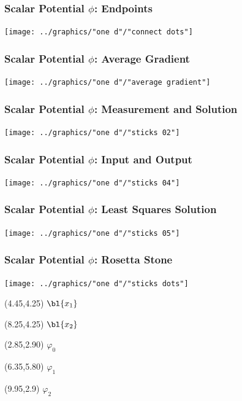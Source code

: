 \documentclass[handout]{beamer}
\begin{document}
\begin{frame}      %
\frametitle{Scalar Potential $\phi$: Endpoints}
  \begin{center}
    \texttt{[image: ../graphics/"one d"/"connect dots"]}
  \end{center}
\end{frame}

\begin{frame}      %
\frametitle{Scalar Potential $\phi$: Average Gradient}
  \begin{center}
    \texttt{[image: ../graphics/"one d"/"average gradient"]}
  \end{center}
\end{frame}

\begin{frame}      %
\frametitle{Scalar Potential $\phi$: Measurement and Solution}
  \begin{center}
    \texttt{[image: ../graphics/"one d"/"sticks 02"]}
  \end{center}
\end{frame}

\begin{frame}      %
\frametitle{Scalar Potential $\phi$: Input and Output}
  \begin{center}
    \texttt{[image: ../graphics/"one d"/"sticks 04"]}
  \end{center}
\end{frame}

\begin{frame}      %
\frametitle{Scalar Potential $\phi$: Least Squares Solution}
  \begin{center}
    \texttt{[image: ../graphics/"one d"/"sticks 05"]}
  \end{center}
\end{frame}

\begin{frame}      %
\frametitle{Scalar Potential $\phi$: Rosetta Stone}
  \begin{center}
    \texttt{[image: ../graphics/"one d"/"sticks dots"]}
  \end{center}
  \begin{textblock}{2.75}(4.45,4.25)
    $\bl{x_{1}}$
  \end{textblock}
  \begin{textblock}{2.75}(8.25,4.25)
    $\bl{x_{2}}$
  \end{textblock}
  \begin{textblock}{2.75}(2.85,2.90)
    $\varphi_{0}$
  \end{textblock}
  \begin{textblock}{2.75}(6.35,5.80)
    $\varphi_{1}$
  \end{textblock}
  \begin{textblock}{2.75}(9.95,2.9)
    $\varphi_{2}$
  \end{textblock}
\end{frame}
\end{document}
